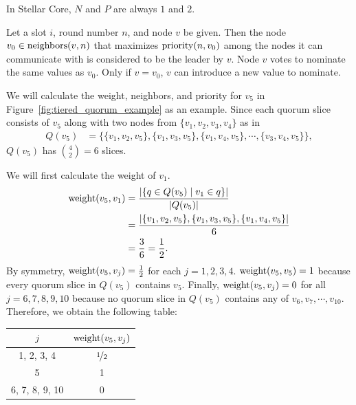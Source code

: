\begin{rem}
    In Stellar Core, $N$ and $P$ are always $1$ and $2$.
\end{rem}

\begin{defn}[Leader]
    Let a slot $i$, round number $n$, and node $v$ be given.
    Then the node $v_0 \in \operatorname{neighbors}(v, n)$ that maximizes $\operatorname{priority}(n, v_0)$ among the nodes it can communicate with is considered to be the leader by $v$.
    Node $v$ votes to nominate the same values as $v_0$.
    Only if $v = v_0$, $v$ can introduce a new value to nominate.
\end{defn}

\begin{exmp}
    We will calculate the weight, neighbors, and priority for $v_5$ in Figure~\ref{fig:tiered_quorum_example} as an example.
    Since each quorum slice consists of $v_5$ along with two nodes from $\{ v_1, v_2, v_3, v_4 \}$ as in
    \begin{align*}
        Q(v_5) &= \{ \{ v_1, v_2, v_5 \}, \{ v_1, v_3, v_5 \}, \{ v_1, v_4, v_5 \}, \cdots, \{ v_3, v_4, v_5 \} \},
    \end{align*}
    $Q(v_5)$ has $\binom{4}{2} = 6$ slices.

    We will first calculate the weight of $v_1$.
    \begin{align*}
        \operatorname{weight}(v_5, v_1)
            &= \frac{\abs{\{ q \in Q(v_5) \mid v_1 \in q \}}}{\abs{Q(v_5)}} \\
            &= \frac{\abs{ \{ v_1, v_2, v_5 \}, \{ v_1, v_3, v_5 \}, \{ v_1, v_4, v_5 \}}}{6} \\
            &= \frac{3}{6} = \frac{1}{2}.
    \end{align*}
    By symmetry, $\operatorname{weight}(v_5, v_j) = \frac{1}{2}$ for each $j = 1, 2, 3, 4$.
    $\operatorname{weight}(v_5, v_5) = 1$ because every quorum slice in $Q(v_5)$ contains $v_5$.
    Finally, $\operatorname{weight}(v_5, v_j) = 0$ for all $j = 6, 7, 8, 9, 10$ because no quorum slice in $Q(v_5)$ contains any of $v_6, v_7, \cdots, v_{10}$.
    Therefore, we obtain the following table:
    \begin{center}
      \begin{tabular}{ | c | c | }
        \hline
          $j$ & $\operatorname{weight}(v_5, v_j)$ \\ \hline
          1, 2, 3, 4 & $\nicefrac{1}{2}$ \\ \hline 
          5 & 1 \\ \hline 
          6, 7, 8, 9, 10 & 0 \\
        \hline
      \end{tabular}
    \end{center}


\end{exmp}
